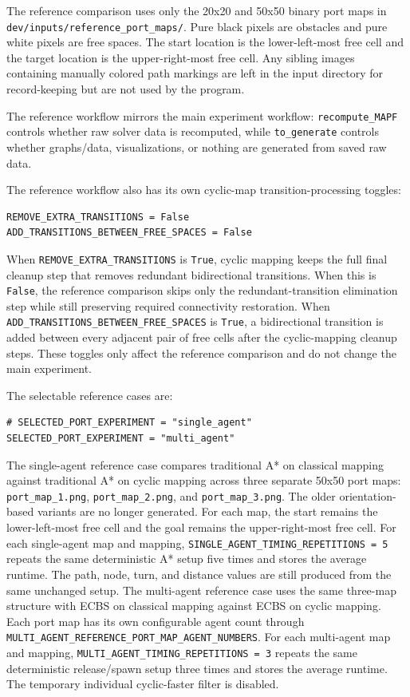 \documentclass[11pt]{article}
\begin{document}
The reference comparison uses only the 20x20 and 50x50 binary port maps in \texttt{dev/inputs/reference\_port\_maps/}. Pure black pixels are obstacles and pure white pixels are free spaces. The start location is the lower-left-most free cell and the target location is the upper-right-most free cell. Any sibling images containing manually colored path markings are left in the input directory for record-keeping but are not used by the program.

The reference workflow mirrors the main experiment workflow: \texttt{recompute\_MAPF} controls whether raw solver data is recomputed, while \texttt{to\_generate} controls whether graphs/data, visualizations, or nothing are generated from saved raw data.

The reference workflow also has its own cyclic-map transition-processing toggles:

\begin{lstlisting}
REMOVE_EXTRA_TRANSITIONS = False
ADD_TRANSITIONS_BETWEEN_FREE_SPACES = False
\end{lstlisting}

When \texttt{REMOVE\_EXTRA\_TRANSITIONS} is \texttt{True}, cyclic mapping keeps the full final cleanup step that removes redundant bidirectional transitions. When this is \texttt{False}, the reference comparison skips only the redundant-transition elimination step while still preserving required connectivity restoration. When \texttt{ADD\_TRANSITIONS\_BETWEEN\_FREE\_SPACES} is \texttt{True}, a bidirectional transition is added between every adjacent pair of free cells after the cyclic-mapping cleanup steps. These toggles only affect the reference comparison and do not change the main experiment.

The selectable reference cases are:

\begin{lstlisting}
# SELECTED_PORT_EXPERIMENT = "single_agent"
SELECTED_PORT_EXPERIMENT = "multi_agent"
\end{lstlisting}

The single-agent reference case compares traditional A* on classical mapping against traditional A* on cyclic mapping across three separate 50x50 port maps: \texttt{port\_map\_1.png}, \texttt{port\_map\_2.png}, and \texttt{port\_map\_3.png}. The older orientation-based variants are no longer generated. For each map, the start remains the lower-left-most free cell and the goal remains the upper-right-most free cell. For each single-agent map and mapping, \texttt{SINGLE\_AGENT\_TIMING\_REPETITIONS = 5} repeats the same deterministic A* setup five times and stores the average runtime. The path, node, turn, and distance values are still produced from the same unchanged setup. The multi-agent reference case uses the same three-map structure with ECBS on classical mapping against ECBS on cyclic mapping. Each port map has its own configurable agent count through \texttt{MULTI\_AGENT\_REFERENCE\_PORT\_MAP\_AGENT\_NUMBERS}. For each multi-agent map and mapping, \texttt{MULTI\_AGENT\_TIMING\_REPETITIONS = 3} repeats the same deterministic release/spawn setup three times and stores the average runtime. The temporary individual cyclic-faster filter is disabled.
\end{document}
